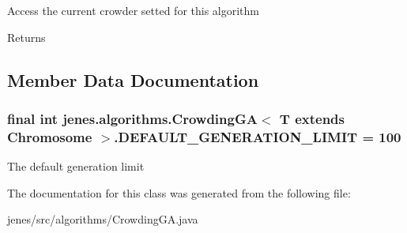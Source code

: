 Access the current crowder setted for this algorithm \begin{DoxyReturn}{Returns}

\end{DoxyReturn}


\subsection{Member Data Documentation}
\hypertarget{classjenes_1_1algorithms_1_1_crowding_g_a_3_01_t_01extends_01_chromosome_01_4_afb96c2e73129293b45044998e3614c06}{
\subsubsection[{D\-E\-F\-A\-U\-L\-T\-\_\-\-G\-E\-N\-E\-R\-A\-T\-I\-O\-N\-\_\-\-L\-I\-M\-I\-T}]{\setlength{\rightskip}{0pt plus 5cm}final int jenes.\-algorithms.\-Crowding\-G\-A$<$ T extends Chromosome $>$.D\-E\-F\-A\-U\-L\-T\-\_\-\-G\-E\-N\-E\-R\-A\-T\-I\-O\-N\-\_\-\-L\-I\-M\-I\-T = 100\hspace{0.3cm}{\ttfamily [static]}}}\label{classjenes_1_1algorithms_1_1_crowding_g_a_3_01_t_01extends_01_chromosome_01_4_afb96c2e73129293b45044998e3614c06}
The default generation limit 

The documentation for this class was generated from the following file\-:\begin{DoxyCompactItemize}
\item 
jenes/src/algorithms/Crowding\-G\-A.\-java\end{DoxyCompactItemize}
